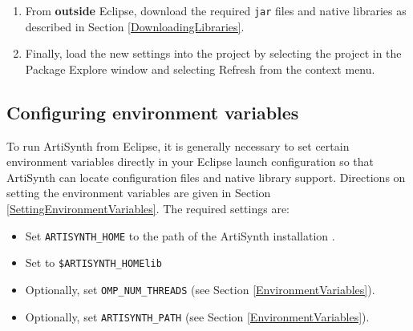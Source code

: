 \begin{enumerate}
\ifMacOS
\begin{sideblock}
{\bf Attention MacOS users:}\\[0.5em]
The default zip utility on MacOS will create a new sub-folder called 
{\tt eclipseSettings} and will extract the files there.  
\emph{You do not want this!!}
Some of the files are then labelled as ``hidden'' by MacOS, which will
prevent you from moving them to the correct place manually. 
Either extract the file directly to the {\tt\$ARTISYNTH\_HOME} directory 
with a more standard application like {-Zip} ({\sf 7zX} for OSX), 
or use the {\tt unzip} utility from the command-line. For the latter,
open a terminal window, change to the ArtiSynth install directory,
enter the command
\begin{verbatim}
  unzip support/eclipse/eclipseSettings.zip
\end{verbatim}
and respond with {\tt y} when asked if it is OK to replace {\tt .project}.
\end{sideblock}
\fi

\item From {\bf outside} Eclipse, download
the required {\tt jar}
files and native libraries as described in Section \ref{DownloadingLibraries}.

\item Finally, load the new settings into the project by selecting the
project in the {\sf Package Explore} window and selecting {\sf
Refresh} from the context menu.

\end{enumerate}

\subsection{Configuring environment variables}
\label{EclipseEnvironmentVariables}

To run ArtiSynth from Eclipse, it is generally necessary to set certain
environment variables directly in your Eclipse launch configuration so
that ArtiSynth can locate configuration files and native library
support. Directions on setting the environment variables are given
in Section \ref{SettingEnvironmentVariables}. The required
settings are:

\begin{itemize}

\item Set {\tt ARTISYNTH\_HOME} to the path of the ArtiSynth
installation \directory.

\item Set {\tt \LIBRARYPATH} to {\tt \$ARTISYNTH\_HOME\SEP lib\SEP \ARCH}

\item Optionally, set {\tt OMP\_NUM\_THREADS} (see Section
\ref{EnvironmentVariables}).

\item Optionally, set {\tt ARTISYNTH\_PATH} 
(see Section \ref{EnvironmentVariables}).

\end{itemize}

